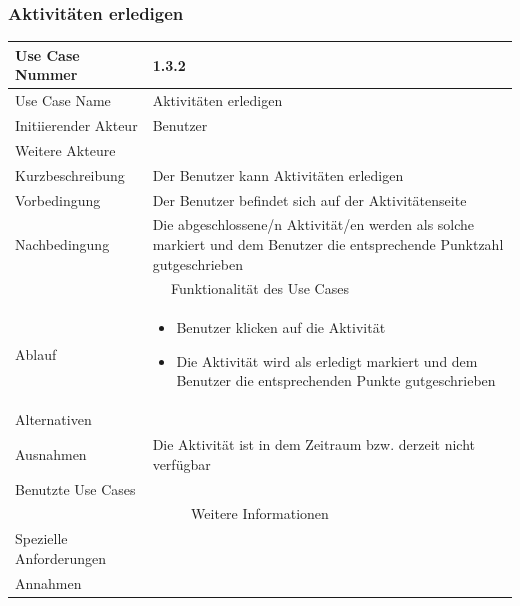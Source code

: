 \documentclass[10pt,a4paper]{article}
\begin{document}
	\subsubsection{Aktivit\"aten erledigen}
	\begin{tabularx}{\textwidth}{|l|X|}
	\hline Use Case Nummer & 1.3.2\\ 
	\hline Use Case Name & Aktivit\"aten erledigen \\ 
	\hline Initiierender Akteur & Benutzer \\
	\hline Weitere Akteure & \\
	\hline Kurzbeschreibung & Der Benutzer kann Aktivit\"aten erledigen \\
	\hline Vorbedingung & Der Benutzer befindet sich auf der Aktivit\"atenseite \\
	\hline Nachbedingung & Die abgeschlossene/n Aktivit\"at/en werden als solche markiert und dem Benutzer die entsprechende Punktzahl gutgeschrieben \\
	\hline \multicolumn{2}{|c|}{Funktionalität des Use Cases}\\
	\hline Ablauf & \begin{itemize}
			\item Benutzer klicken auf die Aktivit\"at
			\item Die Aktivit\"at wird als erledigt markiert und dem Benutzer die entsprechenden Punkte gutgeschrieben
		\end{itemize} \\
	\hline Alternativen & \\
	\hline Ausnahmen & Die Aktivit\"at ist in dem Zeitraum bzw. derzeit nicht verf\"ugbar \\
	\hline Benutzte Use Cases &  \\
	\hline \multicolumn{2}{|c|}{Weitere Informationen} \\
	\hline Spezielle Anforderungen & \\
	\hline Annahmen & \\
	\hline
	\end{tabularx} 
\end{document}
